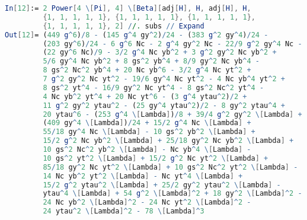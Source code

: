 \documentclass{scrartcl}
\begin{document}
\begin{lstlisting}[language=mathematica,mathescape,columns=flexible,backgroundcolor=\color{light-gray}]
In[12]:= 2 Power[4 \[Pi], 4] \[Beta][adj[H], H, adj[H], H, 
         {1, 1, 1, 1, 1}, {1, 1, 1, 1, 1}, {1, 1, 1, 1, 1}, 
         {1, 1, 1, 1, 1}, 2] //. subs // Expand         
Out[12]= (449 g^6)/8 - (145 g^4 gy^2)/24 - (383 g^2 gy^4)/24 - 
         (203 gy^6)/24 - 6 g^6 Nc - 2 g^4 gy^2 Nc - 22/9 g^2 gy^4 Nc - 
         (22 gy^6 Nc)/9 - 3/2 g^4 Nc yb^2 + 3 g^2 gy^2 Nc yb^2 + 
         5/6 gy^4 Nc yb^2 + 8 gs^2 yb^4 + 8/9 gy^2 Nc yb^4 - 
         8 gs^2 Nc^2 yb^4 + 20 Nc yb^6 - 3/2 g^4 Nc yt^2 + 
         7 g^2 gy^2 Nc yt^2 - 19/6 gy^4 Nc yt^2 - 4 Nc yb^4 yt^2 + 
         8 gs^2 yt^4 - 16/9 gy^2 Nc yt^4 - 8 gs^2 Nc^2 yt^4 - 
         4 Nc yb^2 yt^4 + 20 Nc yt^6 - (3 g^4 ytau^2)/2 + 
         11 g^2 gy^2 ytau^2 - (25 gy^4 ytau^2)/2 - 8 gy^2 ytau^4 + 
         20 ytau^6 - (253 g^4 \[Lambda])/8 + 39/4 g^2 gy^2 \[Lambda] + 
         (409 gy^4 \[Lambda])/24 + 15/2 g^4 Nc \[Lambda] + 
         55/18 gy^4 Nc \[Lambda] - 10 gs^2 yb^2 \[Lambda] + 
         15/2 g^2 Nc yb^2 \[Lambda] + 25/18 gy^2 Nc yb^2 \[Lambda] + 
         10 gs^2 Nc^2 yb^2 \[Lambda] - Nc yb^4 \[Lambda] - 
         10 gs^2 yt^2 \[Lambda] + 15/2 g^2 Nc yt^2 \[Lambda] + 
         85/18 gy^2 Nc yt^2 \[Lambda] + 10 gs^2 Nc^2 yt^2 \[Lambda] - 
         14 Nc yb^2 yt^2 \[Lambda] - Nc yt^4 \[Lambda] + 
         15/2 g^2 ytau^2 \[Lambda] + 25/2 gy^2 ytau^2 \[Lambda] - 
         ytau^4 \[Lambda] + 54 g^2 \[Lambda]^2 + 18 gy^2 \[Lambda]^2 - 
         24 Nc yb^2 \[Lambda]^2 - 24 Nc yt^2 \[Lambda]^2 - 
         24 ytau^2 \[Lambda]^2 - 78 \[Lambda]^3
         
\end{lstlisting}
\newpage
\printbibliography
\end{document}
